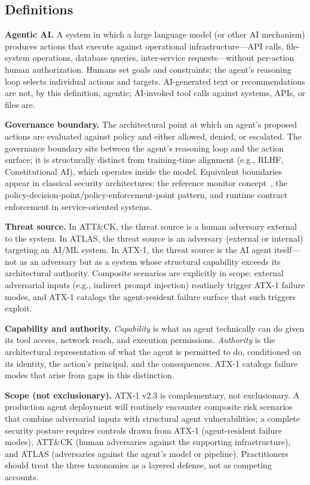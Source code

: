 \documentclass{IEEEoj-data}
\newcommand{\added}[1]{#1}
\begin{document}
\subsection*{\added{Definitions}}

\added{{\bf Agentic AI.} A system in which a large language model (or other AI mechanism) produces actions that execute against operational infrastructure---API calls, file-system operations, database queries, inter-service requests---without per-action human authorization. Humans set goals and constraints; the agent's reasoning loop selects individual actions and targets. AI-generated text or recommendations are not, by this definition, agentic; AI-invoked tool calls against systems, APIs, or files are.}

\added{{\bf Governance boundary.} The architectural point at which an agent's proposed actions are evaluated against policy and either allowed, denied, or escalated. The governance boundary sits between the agent's reasoning loop and the action surface; it is structurally distinct from training-time alignment (e.g., RLHF, Constitutional AI), which operates inside the model. Equivalent boundaries appear in classical security architectures: the reference monitor concept~\mbox{\cite{ref10}}, the policy-decision-point/policy-enforcement-point pattern, and runtime contract enforcement in service-oriented systems.}

\added{{\bf Threat source.} In ATT\&CK, the threat source is a human adversary external to the system. In ATLAS, the threat source is an adversary (external or internal) targeting an AI/ML system. In ATX-1, the threat source is the AI agent itself---not as an adversary but as a system whose structural capability exceeds its architectural authority. Composite scenarios are explicitly in scope: external adversarial inputs (e.g., indirect prompt injection) routinely trigger ATX-1 failure modes, and ATX-1 catalogs the agent-resident failure surface that such triggers exploit.}

\added{{\bf Capability and authority.} {\it Capability} is what an agent technically can do given its tool access, network reach, and execution permissions. {\it Authority} is the architectural representation of what the agent is permitted to do, conditioned on its identity, the action's principal, and the consequences. ATX-1 catalogs failure modes that arise from gaps in this distinction.}

\added{{\bf Scope (not exclusionary).} ATX-1 v2.3 is complementary, not exclusionary. A production agent deployment will routinely encounter composite risk scenarios that combine adversarial inputs with structural agent vulnerabilities; a complete security posture requires controls drawn from ATX-1 (agent-resident failure modes), ATT\&CK (human adversaries against the supporting infrastructure), and ATLAS (adversaries against the agent's model or pipeline). Practitioners should treat the three taxonomies as a layered defense, not as competing accounts.}
\end{document}
